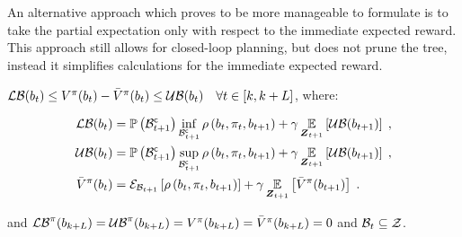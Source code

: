 An alternative approach which proves to be more manageable to formulate is to take the partial expectation only with respect to the immediate expected reward. This approach still allows for closed-loop planning, but does not prune the tree, instead it simplifies calculations for the immediate expected reward.
\begin{corollaryE}
	\label{thm:val_func_immediate_bounds_obs_bellman}
	$\lowerbound(\blf{t})\leq V^\pi(\blf{t})-\bar{V}^\pi(\blf{t})\leq\upperbound(\blf{t})\quad\forall t\in[k,k+L]$, where:
	\begin{small}
		\begin{subequations}
			\begin{align}
				\lowerbound(\blf{t}) & =\measure{\stcompI{\subSpace}{t+1}}\inf_{\stcompI{\subSpace}{t+1}}\reward{\blf{t},\pi_t,\blf{t+1}}+\gamma\expectation{\upperbound(\blf{t+1})}{\observationsRV{t+1}}\;,\\
				\upperbound(\blf{t}) & =\measure{\stcompI{\subSpace}{t+1}}\sup_{\stcompI{\subSpace}{t+1}}\reward{\blf{t},\pi_t,\blf{t+1}}+\gamma\expectation{\upperbound(\blf{t+1})}{\observationsRV{t+1}}\;,\\
				\bar{V}^\pi(\blf{t}) & =\partialexpectation{\reward{\blf{t},\pi_{t},\blf{t+1}}}{\subSpaceI{t+1}}+\gamma\expectation{\bar{V}^\pi(\blf{t+1})}{\observationsRV{t+1}}\;.
			\end{align}
		\end{subequations}
	\end{small}
	and $\lowerbound^\pi(\blf{k+L})=\upperbound^\pi(\blf{k+L})=V^\pi(\blf{k+L})=\bar{V}^\pi(\blf{k+L})=0$ and $\subSpaceI{t}\subseteq\observationSpace$.
\end{corollaryE}
